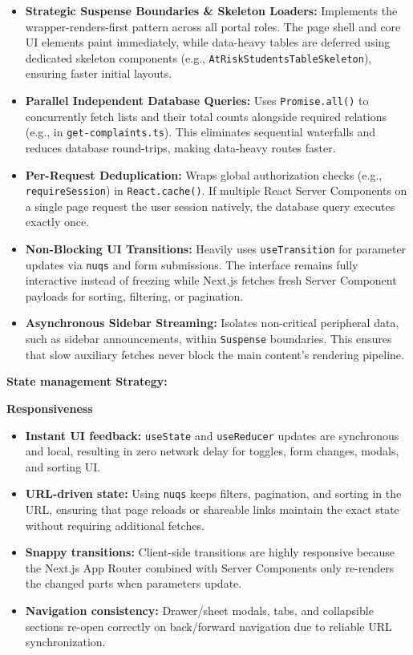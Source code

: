 \begin{itemize}
    \item \textbf{Strategic Suspense Boundaries \& Skeleton Loaders:} Implements the wrapper-renders-first pattern across all portal roles. The page shell and core UI elements paint immediately, while data-heavy tables are deferred using dedicated skeleton components (e.g., \texttt{AtRiskStudentsTableSkeleton}), ensuring faster initial layouts.
    \item \textbf{Parallel Independent Database Queries:} Uses \texttt{Promise.all()} to concurrently fetch lists and their total counts alongside required relations (e.g., in \texttt{get-complaints.ts}). This eliminates sequential waterfalls and reduces database round-trips, making data-heavy routes faster.
    \item \textbf{Per-Request Deduplication:} Wraps global authorization checks (e.g., \texttt{requireSession}) in \texttt{React.cache()}. If multiple React Server Components on a single page request the user session natively, the database query executes exactly once.
    \item \textbf{Non-Blocking UI Transitions:} Heavily uses \texttt{useTransition} for parameter updates via \texttt{nuqs} and form submissions. The interface remains fully interactive instead of freezing while Next.js fetches fresh Server Component payloads for sorting, filtering, or pagination.
    \item \textbf{Asynchronous Sidebar Streaming:} Isolates non-critical peripheral data, such as sidebar announcements, within \texttt{Suspense} boundaries. This ensures that slow auxiliary fetches never block the main content's rendering pipeline.
\end{itemize}


\textbf{State management Strategy:}

\textbf{Responsiveness}
\begin{itemize}
    \item \textbf{Instant UI feedback:} \texttt{useState} and \texttt{useReducer} updates are synchronous and local, resulting in zero network delay for toggles, form changes, modals, and sorting UI.
    \item \textbf{URL-driven state:} Using \texttt{nuqs} keeps filters, pagination, and sorting in the URL, ensuring that page reloads or shareable links maintain the exact state without requiring additional fetches.
    \item \textbf{Snappy transitions:} Client-side transitions are highly responsive because the Next.js App Router combined with Server Components only re-renders the changed parts when parameters update.
    \item \textbf{Navigation consistency:} Drawer/sheet modals, tabs, and collapsible sections re-open correctly on back/forward navigation due to reliable URL synchronization.
\end{itemize}

